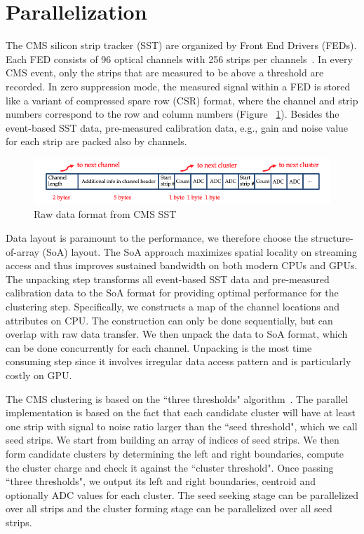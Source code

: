\documentclass[10pt, paper=a4, UKenglish]{article}
\begin{document}
\section{Parallelization}
\label{para}
The CMS silicon strip tracker (SST) are organized by Front End Drivers (FEDs). Each FED consists of 96 optical channels with 256 strips per channels~\cite{CMSTWiki}. In every CMS event, only the strips that are measured to be above a threshold are recorded. In zero suppression mode, the measured signal within a FED is stored like a variant of compressed spare row (CSR) format, where the channel and strip numbers correspond to the row and column numbers (Figure ~\ref{fig:SSTlayout}). Besides the event-based SST data, pre-measured calibration data, e.g., gain and noise value for each strip are packed also by channels. 

\begin{figure}[!htb]
  \centering
  \includegraphics[scale=0.5]{SSTlayout}
  \caption{Raw data format from CMS SST}
  \label{fig:SSTlayout}
\end{figure}

Data layout is paramount to the performance, we therefore choose the structure-of-array (SoA) layout. The SoA approach maximizes spatial locality on streaming access and thus improves sustained bandwidth on both modern CPUs and GPUs. The unpacking step transforms all event-based SST data and pre-measured calibration data to the SoA format for providing optimal performance for the clustering step. Specifically, we constructs a map of the channel locations and attributes on CPU. The construction can only be done sequentially, but can overlap with raw data transfer. We then unpack the data to SoA format, which can be done concurrently for each channel. Unpacking is the most time consuming step since it involves irregular data access pattern and is particularly costly on GPU. 

The CMS clustering is based on the ``three thresholds" algorithm~\cite{CMSTWiki}. The parallel implementation is based on the fact that each candidate cluster will have at least one strip with signal to noise ratio larger than the ``seed threshold", which we call seed strips. We start from building an array of indices of seed strips. We then form candidate clusters by determining the left and right boundaries, compute the cluster charge and check it against the ``cluster threshold". Once passing ``three thresholds", we output its left and right boundaries, centroid and optionally ADC values for each cluster. The seed seeking stage can be parallelized over all strips and the cluster forming stage can be parallelized over all seed strips. 
\end{document}
